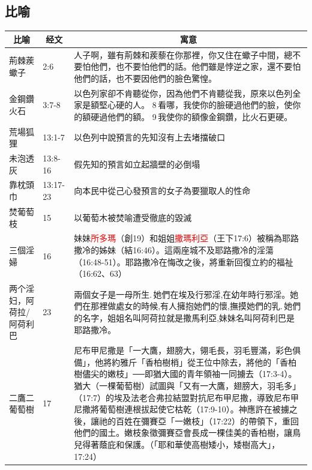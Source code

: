 \subsection{比喻}
\begin{table}[H]
\centering
\begin{tabular}{p{1.75cm}|p{1.50cm}|p{13.0cm}}\hline\hline
\multicolumn{1}{c|}{比喻}&\multicolumn{1}{c|}{经文}&\multicolumn{1}{c}{寓意}\\\hline

荊棘蒺蠍子&2:6&人子啊，雖有荊棘和蒺藜在你那裡，你又住在蠍子中間，總不要怕他們，也不要怕他們的話。他們雖是悖逆之家，還不要怕他們的話，也不要因他們的臉色驚惶。\\\hline 
金鋼鑽火石&3:7-8&以色列家卻不肯聽從你，因為他們不肯聽從我，原來以色列全家是額堅心硬的人。 8 看哪，我使你的臉硬過他們的臉，使你的額硬過他們的額。 9 我使你的額像金鋼鑽，比火石更硬。\\\hline

荒場狐狸&13:1-7&以色列中說預言的先知沒有上去堵擋破口\\\hline
未泡透灰&13:8-16&假先知的預言如立起牆壁的必倒塌\\\hline
靠枕頭巾&13:17-23&向本民中從己心發預言的女子為要獵取人的性命\\\hline
焚葡萄枝& 15&以葡萄木被焚喻遭受徹底的毀滅\\\hline 
三個淫婦&16&妹妹\textcolor{red}{所多瑪}（創19）和姐姐\textcolor{red}{撒瑪利亞}（王下17:6）被稱為耶路撒冷的姊妹（結16:46）。這兩座城不及耶路撒冷的淫蕩（16:48-51）。耶路撒冷在悔改之後，將重新回復立約的福祉（16:62、63）\\\hline
两个淫妇，阿荷拉/阿荷利巴&23&兩個女子是一母所生. 她們在埃及行邪淫,在幼年時行邪淫。她們在那裡做處女的時候,有人擁抱她們的懷,撫摸她們的乳. 她們的名字，姐姐名叫阿荷拉就是撒馬利亞,妹妹名叫阿荷利巴是耶路撒冷。\\\hline
二鷹二葡萄樹&17&尼布甲尼撒是「一大鷹，翅膀大，翎毛長，羽毛豐滿，彩色俱備」，他將約雅斤「香柏樹梢」從王位中除去，將他的「香柏樹儘尖的嫩枝」──即猶大國的青年領袖一同擄去（17:3-4）。猶大（一棵葡萄樹）試圖與「又有一大鷹，翅膀大，羽毛多」（17:7）的埃及法老合弗拉結盟對抗尼布甲尼撒，導致尼布甲尼撒將葡萄樹連根拔起使它枯乾（17:9-10）。神應許在被擄之後，讓祂的百姓在彌賽亞「一嫩枝」（17:22）的帶領下，重回他們的國土。嫩枝象徵彌賽亞會長成一棵佳美的香柏樹，讓鳥兒得著蔭庇和保護。（「耶和華使高樹矮小，矮樹高大」，17:24）\\\hline


\end{tabular}
\end{table}
